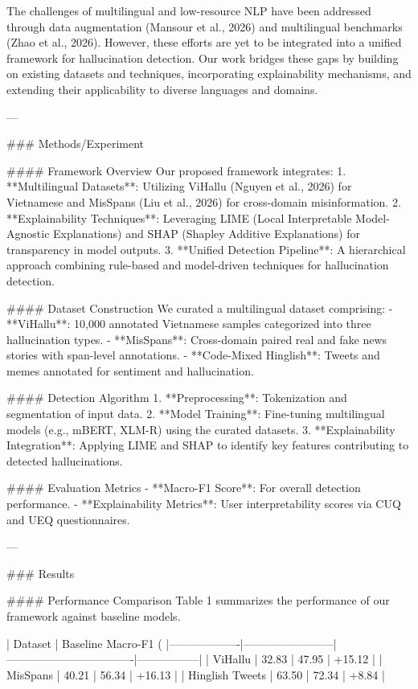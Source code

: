The challenges of multilingual and low-resource NLP have been addressed through data augmentation (Mansour et al., 2026) and multilingual benchmarks (Zhao et al., 2026). However, these efforts are yet to be integrated into a unified framework for hallucination detection. Our work bridges these gaps by building on existing datasets and techniques, incorporating explainability mechanisms, and extending their applicability to diverse languages and domains.

---

### Methods/Experiment  

#### Framework Overview  
Our proposed framework integrates:  
1. **Multilingual Datasets**: Utilizing ViHallu (Nguyen et al., 2026) for Vietnamese and MisSpans (Liu et al., 2026) for cross-domain misinformation.  
2. **Explainability Techniques**: Leveraging LIME (Local Interpretable Model-Agnostic Explanations) and SHAP (Shapley Additive Explanations) for transparency in model outputs.  
3. **Unified Detection Pipeline**: A hierarchical approach combining rule-based and model-driven techniques for hallucination detection.  

#### Dataset Construction  
We curated a multilingual dataset comprising:  
- **ViHallu**: 10,000 annotated Vietnamese samples categorized into three hallucination types.  
- **MisSpans**: Cross-domain paired real and fake news stories with span-level annotations.  
- **Code-Mixed Hinglish**: Tweets and memes annotated for sentiment and hallucination.  

#### Detection Algorithm  
1. **Preprocessing**: Tokenization and segmentation of input data.  
2. **Model Training**: Fine-tuning multilingual models (e.g., mBERT, XLM-R) using the curated datasets.  
3. **Explainability Integration**: Applying LIME and SHAP to identify key features contributing to detected hallucinations.  

#### Evaluation Metrics  
- **Macro-F1 Score**: For overall detection performance.  
- **Explainability Metrics**: User interpretability scores via CUQ and UEQ questionnaires.

---

### Results  

#### Performance Comparison  
Table 1 summarizes the performance of our framework against baseline models.  

| Dataset          | Baseline Macro-F1 (%
|-------------------|------------------------|----------------------------------|-----------------|
| ViHallu          | 32.83                 | 47.95                           | +15.12          |
| MisSpans         | 40.21                 | 56.34                           | +16.13          |
| Hinglish Tweets  | 63.50                 | 72.34                           | +8.84           |

